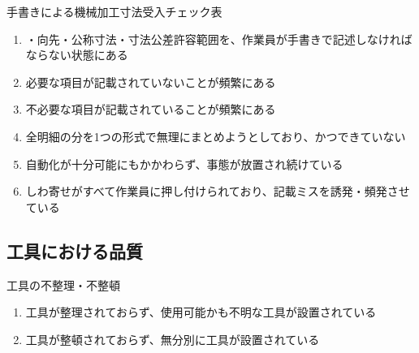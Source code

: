 \begin{Issues}{手書きによる機械加工寸法受入チェック表}
\begin{enumerate}[label=\sarrow]
\item[{\sarrow[red]}]\DrawingNumber・向先・公称寸法・寸法公差許容範囲を、作業員が手書きで記述しなければならない状態にある
\item[{\sarrow[red]}]必要な項目が記載されていないことが頻繁にある
\item[{\sarrow[red]}]不必要な項目が記載されていることが頻繁にある
\item[{\sarrow[red]}]全明細の分を1つの形式で無理にまとめようとしており、かつできていない
\item[{\sarrow[red]}]自動化が十分可能にもかかわらず、事態が放置され続けている
\item[{\sarrow[red]}]しわ寄せがすべて作業員に押し付けられており、記載ミスを誘発・頻発させている
\end{enumerate}
\end{Issues}


\subsection{工具における品質}

\begin{Issues}{工具の不整理・不整頓}
\begin{enumerate}[label=\sarrow]
\item 工具が整理されておらず、使用可能かも不明な工具が設置されている
\item 工具が整頓されておらず、無分別に工具が設置されている
\end{enumerate}
\end{Issues}



\clearpage


